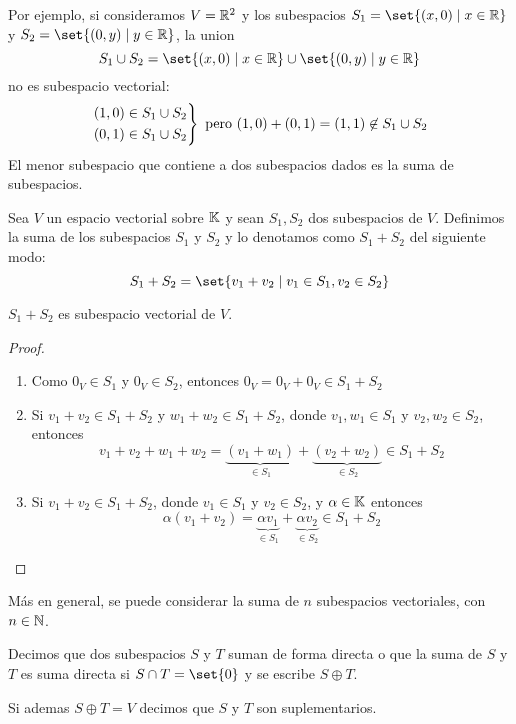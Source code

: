 Por ejemplo, si consideramos \(V = \mathbb{R}^{2 } \) y los subespacios \(S_1 = \set{(x,0) \mid x \in \R }\) y \(S_2 = \set{(0,y) \mid y \in \R }\), la union
\[
	S_1 \cup S_2 = \set{(x,0) \mid x \in \R} \cup \set{(0,y) \mid y \in \R }
\]
no es subespacio vectorial:
\[
	\begin{rcases}
		(1,0) \in S_1 \cup S_2 \\
		(0,1) \in S_1 \cup  S_2
	\end{rcases} \text{ pero } (1,0) + (0,1) = (1,1) \not\in S_1 \cup S_2
\]
El menor subespacio que contiene a dos subespacios dados es la suma de subespacios.
\begin{definition}
	Sea \(V \) un espacio vectorial sobre \(\mathbb{K} \) y sean \(S_1, S_2 \) dos subespacios de \(V \). Definimos la suma de los subespacios \(S_1 \) y \(S_2 \) y lo denotamos como \(S_1 + S_2 \) del siguiente modo:
	\[
		S_1 + S_2 = \set{v_1 + v_2 \mid v_1 \in S_1, v_2 \in S_2 }
	\]
\end{definition}
\begin{proposition}
	\(S_1 + S_2 \) es subespacio vectorial de \(V \).
\end{proposition}
\begin{proof}
	\begin{enumerate}
		\item Como \(0_V \in S_1\) y \(0_V \in S_2 \), entonces \(0_V = 0_V + 0_V \in  S_1 + S_2 \)
		\item Si \(v_1 + v_2 \in S_1 + S_2 \) y \(w_1 + w_2 \in S_1 + S_2 \), donde \(v_1,w_1 \in S_1 \) y \(v_2, w_2 \in S_2 \), entonces
		      \[
			      v_1 + v_2 + w_1 + w_2 = \underbrace{(v_1 + w_1)}_{\in S_1} + \underbrace{(v_2 + w_2)}_{\in S_2} \in S_1 + S_2
		      \]
		\item Si \(v_1 + v_2 \in S_1 + S_2 \), donde \(v_1 \in S_1 \) y \(v_2 \in S_2 \), y \(\alpha \in \mathbb{K} \) entonces
		      \[
			      \alpha (v_1 + v_2) = \underbrace{\alpha v_1}_{\in S_1} + \underbrace{\alpha v_2}_{\in S_2} \in S_1 + S_2
		      \]
	\end{enumerate}
\end{proof}
Más en general, se puede considerar la suma de \(n \) subespacios vectoriales, con \(n \in \mathbb{N}\).
\begin{definition}
	Decimos que dos subespacios \(S \) y \(T \) suman de forma directa o que la suma de \(S \) y \(T \) es suma directa si \(S \cap T = \set{0 }\) y se escribe \(S \oplus T \).

	Si ademas \(S \oplus T = V \) decimos que \(S \) y \(T \) son suplementarios.
\end{definition}
